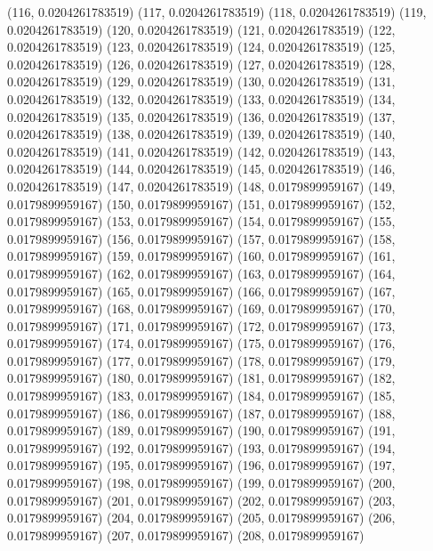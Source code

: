 {					(116, 0.0204261783519)
					(117, 0.0204261783519)
					(118, 0.0204261783519)
					(119, 0.0204261783519)
					(120, 0.0204261783519)
					(121, 0.0204261783519)
					(122, 0.0204261783519)
					(123, 0.0204261783519)
					(124, 0.0204261783519)
					(125, 0.0204261783519)
					(126, 0.0204261783519)
					(127, 0.0204261783519)
					(128, 0.0204261783519)
					(129, 0.0204261783519)
					(130, 0.0204261783519)
					(131, 0.0204261783519)
					(132, 0.0204261783519)
					(133, 0.0204261783519)
					(134, 0.0204261783519)
					(135, 0.0204261783519)
					(136, 0.0204261783519)
					(137, 0.0204261783519)
					(138, 0.0204261783519)
					(139, 0.0204261783519)
					(140, 0.0204261783519)
					(141, 0.0204261783519)
					(142, 0.0204261783519)
					(143, 0.0204261783519)
					(144, 0.0204261783519)
					(145, 0.0204261783519)
					(146, 0.0204261783519)
					(147, 0.0204261783519)
					(148, 0.0179899959167)
					(149, 0.0179899959167)
					(150, 0.0179899959167)
					(151, 0.0179899959167)
					(152, 0.0179899959167)
					(153, 0.0179899959167)
					(154, 0.0179899959167)
					(155, 0.0179899959167)
					(156, 0.0179899959167)
					(157, 0.0179899959167)
					(158, 0.0179899959167)
					(159, 0.0179899959167)
					(160, 0.0179899959167)
					(161, 0.0179899959167)
					(162, 0.0179899959167)
					(163, 0.0179899959167)
					(164, 0.0179899959167)
					(165, 0.0179899959167)
					(166, 0.0179899959167)
					(167, 0.0179899959167)
					(168, 0.0179899959167)
					(169, 0.0179899959167)
					(170, 0.0179899959167)
					(171, 0.0179899959167)
					(172, 0.0179899959167)
					(173, 0.0179899959167)
					(174, 0.0179899959167)
					(175, 0.0179899959167)
					(176, 0.0179899959167)
					(177, 0.0179899959167)
					(178, 0.0179899959167)
					(179, 0.0179899959167)
					(180, 0.0179899959167)
					(181, 0.0179899959167)
					(182, 0.0179899959167)
					(183, 0.0179899959167)
					(184, 0.0179899959167)
					(185, 0.0179899959167)
					(186, 0.0179899959167)
					(187, 0.0179899959167)
					(188, 0.0179899959167)
					(189, 0.0179899959167)
					(190, 0.0179899959167)
					(191, 0.0179899959167)
					(192, 0.0179899959167)
					(193, 0.0179899959167)
					(194, 0.0179899959167)
					(195, 0.0179899959167)
					(196, 0.0179899959167)
					(197, 0.0179899959167)
					(198, 0.0179899959167)
					(199, 0.0179899959167)
					(200, 0.0179899959167)
					(201, 0.0179899959167)
					(202, 0.0179899959167)
					(203, 0.0179899959167)
					(204, 0.0179899959167)
					(205, 0.0179899959167)
					(206, 0.0179899959167)
					(207, 0.0179899959167)
					(208, 0.0179899959167)
}
